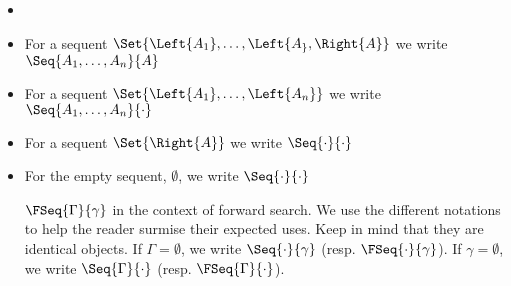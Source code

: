 
\begin{definition}[Notation]
  \begin{itemize}
  \item[]
  \item For a sequent $\Set{\Left{A_1},\ldots,\Left{A_},\Right{A}}$
    we write $\Seq{A_1,\ldots,A_n}{A}$
  \item For a sequent $\Set{\Left{A_1},\ldots,\Left{A_n}}$
    we write $\Seq{A_1,\ldots,A_n}{\cdot}$
  \item For a sequent $\Set{\Right{A}}$
    we write $\Seq{\cdot}{\cdot}$
  \item For the empty sequent, $\emptyset$,
    we write $\Seq{\cdot}{\cdot}$


    $\FSeq{\Gamma}{\gamma}$ in the context of forward
    search.  We use the different notations to help the
    reader surmise their expected uses.  Keep in mind
    that they are identical objects.
    If $\Gamma=\emptyset$, we write $\Seq{\cdot}{\gamma}$
    (resp. $\FSeq{\cdot}{\gamma}$).
    If $\gamma=\emptyset$, we write $\Seq{\Gamma}{\cdot}$
    (resp. $\FSeq{\Gamma}{\cdot}$).
  \end{itemize}
\end{definition}

